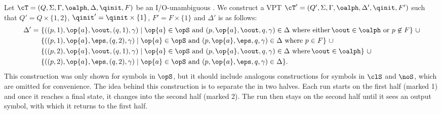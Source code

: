 Let $\cT = (Q, \Sigma, \Gamma, \oalph, \Delta, \qinit, F)$ be an I/O-unambiguous \vpt. We construct a VPT $\cT' = (Q', \Sigma, \Gamma, \oalph, \Delta', \qinit, F')$ such that $Q' = Q \times \{1, 2\}$, $\qinit' = \qinit \times\{1\}$, $F' = F \times\{1\}$ and $\Delta'$ is as follows: 
\begin{align*}
	\Delta' =\ & \{((p,1),\op{a},\oout,(q,1),\gamma)\mid \op{a}\in\opS\text{ and }(p,\op{a},\oout,q,\gamma)\in\Delta\text{ where either }\!\oout\in\oalph\text{ or }p\not\in F\}\ \cup\\
	& \{((p,1),\op{a},\eps,(q,2),\gamma)\mid \op{a}\in\opS\text{ and }(p,\op{a},\eps,q,\gamma)\in\Delta\text{ where } p\in F\}\ \cup\\
	& \{((p,2),\op{a},\oout,(q,1),\gamma)\mid \op{a}\in\opS\text{ and }(p,\op{a},\oout,q,\gamma)\in\Delta\text{ where }\!\oout\in\oalph\}\ \cup\\
	& \{((p,2),\op{a},\eps,(q,2),\gamma)\mid \op{a}\in\opS\text{ and }(p,\op{a},\eps,q,\gamma)\in\Delta\}.
\end{align*}
This construction was only shown for symbols in $\opS$, but it should include analogous constructions for symbols in $\clS$ and $\noS$, which are omitted for convenience.
The idea behind this construction is to separate the \vpt in two halves. Each run starts on the first half (marked 1) and once it reaches a final state, it changes into the second half (marked 2). The run then stays on the second half until it sees an output symbol, with which it returns to the first half.

